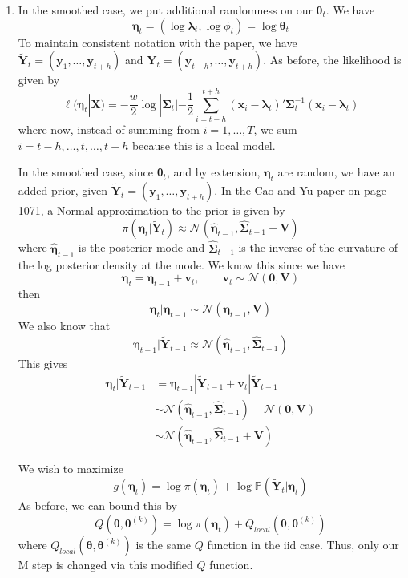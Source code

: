 \documentclass[letterpaper,10pt]{amsart}
\newcommand{\p}[1]{\mathbb{P}\!\left(#1\right)}
\newcommand{\sN}{\mathcal{N}}
\begin{document}
\begin{enumerate}[{1}.1]
\item 
In the smoothed case, we put additional randomness on our $\boldsymbol \theta_t$. We have 
\[\boldsymbol \eta_t = (\log \boldsymbol \lambda_t, \log \phi_t) = \log \boldsymbol \theta_t\]
To maintain consistent notation with the paper, we have $\tilde{\boldsymbol Y}_t = (\boldsymbol y_1,\ldots,\boldsymbol y_{t+h})$ and $\boldsymbol Y_t = (\boldsymbol y_{t-h},\ldots,\boldsymbol y_{t+h})$. As before, the likelihood is given by
\[\ell(\boldsymbol \eta_t | \boldsymbol X) =  -\frac{w}{2}\log | \boldsymbol \Sigma_t| - \frac{1}{2}\sum_{i=t-h}^{t+h} (\boldsymbol x_i - \boldsymbol \lambda_t)' \boldsymbol \Sigma_t^{-1} (\boldsymbol x_i - \boldsymbol \lambda_t) \]
where now, instead of summing from $i=1,\ldots,T$, we sum $i=t-h,\ldots,t,\ldots,t+h$ because this is 
a local model. 

In the smoothed case, since $\boldsymbol \theta_t$, and by extension, $\boldsymbol \eta_t$ are random, we have an added prior, given $\tilde{\boldsymbol Y}_t = (\boldsymbol y_1,\ldots,\boldsymbol y_{t+h})$.
In the Cao and Yu paper on page 1071, a Normal approximation to the prior is given by
\[ \pi(\boldsymbol \eta_t | \tilde{\boldsymbol Y}_t) \approx \sN(\hat{\boldsymbol \eta}_{t-1}, \hat{\boldsymbol \Sigma}_{t-1} + \boldsymbol V) \]
where $\hat{\boldsymbol \eta}_{t-1}$ is the posterior mode and $\hat{\boldsymbol \Sigma}_{t-1}$ is the inverse of the curvature of the log posterior density at the mode. We know this since we have
\[\boldsymbol \eta_t = \boldsymbol \eta_{t-1} + \boldsymbol v_t, \qquad \boldsymbol v_t \sim \sN(\boldsymbol 0,\boldsymbol V)\]
then
\[\boldsymbol \eta_t | \boldsymbol \eta_{t-1} \sim \sN(\boldsymbol \eta_{t-1}, \boldsymbol V)\]
We also know that
\[\boldsymbol \eta_{t-1} | \tilde{\boldsymbol Y}_{t-1} \approx \sN(\hat{\boldsymbol \eta}_{t-1}, \hat{\boldsymbol \Sigma}_{t-1})\]
This gives
\begin{align*}
\boldsymbol \eta_t | \tilde{\boldsymbol Y}_{t-1} &= \boldsymbol \eta_{t-1}| \tilde{\boldsymbol Y}_{t-1} + \boldsymbol v_t | \tilde{\boldsymbol Y}_{t-1}\\
&\sim \sN(\hat{\boldsymbol \eta}_{t-1}, \hat{\boldsymbol  \Sigma}_{t-1}) + \sN(\boldsymbol 0, \boldsymbol V)\\
&\sim \sN(\hat{\boldsymbol \eta}_{t-1}, \hat{\boldsymbol \Sigma}_{t-1} + \boldsymbol V )
\end{align*}

We wish to maximize 
\[g(\boldsymbol \eta_t) = \log \pi(\boldsymbol \eta_t) + \log \p{\tilde{\boldsymbol Y}_t | \boldsymbol \eta_t}\]
As before, we can bound this by
\[Q(\boldsymbol \theta, \boldsymbol \theta^{(k)}) =  \log \pi(\boldsymbol \eta_t) + Q_{local}(\boldsymbol \theta, \boldsymbol \theta^{(k)}) \]
where $Q_{local}(\boldsymbol \theta, \boldsymbol \theta^{(k)}) $ is the same $Q$ function in the iid case. Thus, only our M step is changed via this modified $Q$ function.



\end{enumerate}
\end{document}
